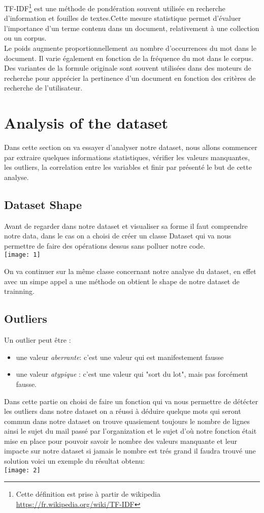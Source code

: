 \documentclass[english,a4paper,11pt,oneside]{article}
\begin{document}
{{		 TF-IDF\footnote{Cette définition est prise à partir de wikipedia \url{https://fr.wikipedia.org/wiki/TF-IDF}} est une méthode de pondération souvent utilisée en recherche d'information et fouilles de textes.Cette mesure statistique permet d'évaluer l'importance d'un terme contenu dans un document, relativement à une collection ou un corpus.\\
		 Le poids augmente proportionnellement au nombre d'occurrences du mot dans le document. Il varie également en fonction de la fréquence du mot dans le corpus.\\
		 Des variantes de la formule originale sont souvent utilisées dans des moteurs de recherche pour apprécier la pertinence d'un document en fonction des critères de recherche de l'utilisateur.
		 
		}
	}
	\section{Analysis of the dataset}{
		Dans cette section on va essayer d'analyser notre dataset, nous allons commencer par extraire quelques informations statistiques, vérifier les valeurs manquantes, les outliers, la correlation entre les variables et finir par présenté le but de cette analyse.
		\subsection{Dataset Shape}{
			Avant de regarder dans notre dataset et visualiser sa forme il faut comprendre notre data, dans le cas on a choisi de créer un classe Dataset qui va nous permettre de faire des opérations dessus sans polluer notre code.\\
			\texttt{[image: 1]}
			
			On va continuer sur la même classe concernant notre analyse du dataset, en effet avec un simpe appel a une méthode on obtient le shape de notre dataset de trainning.\\
		}
		\subsection{Outliers}{
			Un outlier peut être :
			\begin{itemize}
			\item une valeur {\itshape aberrante}: c'est une valeur qui est manifestement fausse
			\item une valeur {\itshape atypique }: c'est une valeur qui "sort du lot", mais pas forcément fausse.
			\end{itemize}
			Dans cette partie on choisi de faire un fonction qui va nous permettre de détécter les outliers dans notre dataset on a réussi à déduire quelque mots qui seront commun dans notre dataset on trouve quasiement toujours le nombre de lignes ainsi le sujet du mail passé par l'organization et le sujet d'où notre fonction était mise en place pour pouvoir savoir le nombre des valeurs manquante et leur impacte sur notre dataset si jamais le nombre est trés grand il faudra trouvé une solution voici un exemple du résultat obtenu:\\
			\texttt{[image: 2]}
			
}}
\end{document}
